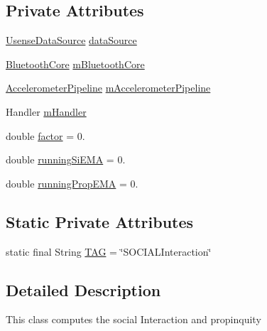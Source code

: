 \subsection*{Private Attributes}
\begin{DoxyCompactItemize}
\item 
\hyperlink{classcs_1_1usense_1_1db_1_1_usense_data_source}{Usense\+Data\+Source} \hyperlink{classcs_1_1usense_1_1inference_module_1_1_social_interaction_ae262493088f3c957e6c2402728e93116}{data\+Source}
\item 
\hyperlink{classcs_1_1usense_1_1bluetooth_1_1_bluetooth_core}{Bluetooth\+Core} \hyperlink{classcs_1_1usense_1_1inference_module_1_1_social_interaction_ad0f1b8b19badca0a9df86456ffce3e9f}{m\+Bluetooth\+Core}
\item 
\hyperlink{classcs_1_1usense_1_1accelerometer_1_1_accelerometer_pipeline}{Accelerometer\+Pipeline} \hyperlink{classcs_1_1usense_1_1inference_module_1_1_social_interaction_a776cd03378e4775b26c921493c79e049}{m\+Accelerometer\+Pipeline}
\item 
Handler \hyperlink{classcs_1_1usense_1_1inference_module_1_1_social_interaction_a7325149b674d22135c0679a44964124b}{m\+Handler}
\item 
double \hyperlink{classcs_1_1usense_1_1inference_module_1_1_social_interaction_a5bbc24e79182377206a5363ce717ef59}{factor} = 0.
\item 
double \hyperlink{classcs_1_1usense_1_1inference_module_1_1_social_interaction_ac3b63042cb32fc5290ec5a4676cb423e}{running\+Si\+E\+M\+A} = 0.
\item 
double \hyperlink{classcs_1_1usense_1_1inference_module_1_1_social_interaction_a9ccb6dd9852d453b7d6da585f41b39f8}{running\+Prop\+E\+M\+A} = 0.
\end{DoxyCompactItemize}
\subsection*{Static Private Attributes}
\begin{DoxyCompactItemize}
\item 
static final String \hyperlink{classcs_1_1usense_1_1inference_module_1_1_social_interaction_a20e5c3ed4759d13c153406d2145d11b5}{T\+A\+G} = \char`\"{}S\+O\+C\+I\+A\+L\+Interaction\char`\"{}
\end{DoxyCompactItemize}


\subsection{Detailed Description}
This class computes the social Interaction and propinquity 

